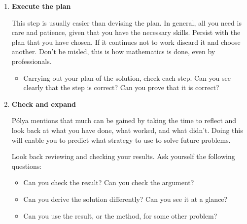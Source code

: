 \documentclass[12pt,a4 paper]{extreport}
\begin{document}
\begin{enumerate}
\item \textbf{Execute the plan}

This step is usually easier than devising the plan. In general, all you need is care and patience, given that you have the necessary skills. Persist with the plan that you have chosen. If it continues not to work discard it and choose another. Don't be misled, this is how mathematics is done, even by professionals.

\begin{itemize}
\item Carrying out your plan of the solution, check each step. Can you see clearly that the step is correct? Can you prove that it is correct?
\end{itemize}

\item \textbf{Check and expand}

P\'{o}lya mentions that much can be gained by taking the time to reflect and look back at what you have done, what worked, and what didn't. Doing this will enable you to predict what strategy to use to solve future problems.

Look back reviewing and checking your results. Ask yourself the following questions:
\begin{itemize}
\item Can you check the result? Can you check the argument?
\item Can you derive the solution differently? Can you see it at a glance?
\item Can you use the result, or the method, for some other problem?
\end{itemize}
\end{enumerate}
\end{document}
